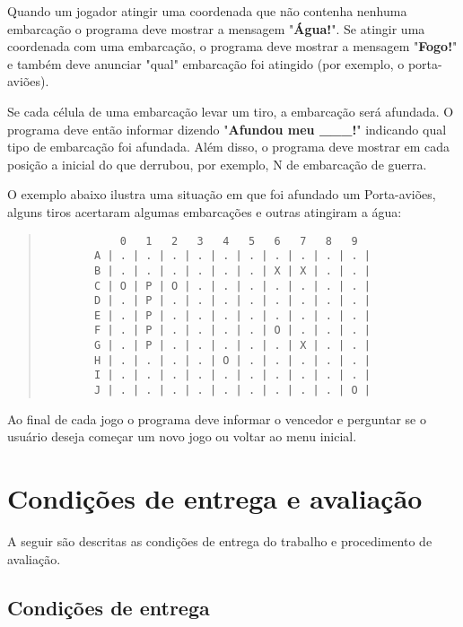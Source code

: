 \documentclass[defesa,oneside]{ppginf}
\begin{document}
Quando um jogador atingir uma coordenada que não contenha nenhuma embarcação o programa deve mostrar a mensagem "\textbf{Água!}". Se atingir uma coordenada com uma embarcação, o programa deve mostrar a mensagem "\textbf{Fogo!}" e também deve anunciar "qual" embarcação foi atingido (por exemplo, o porta-aviões).

Se cada célula de uma embarcação levar um tiro, a embarcação será afundada. O programa deve então informar dizendo "\textbf{Afundou meu \_\_\_!}" indicando qual tipo de embarcação foi afundada. Além disso, o programa deve mostrar em cada posição a inicial do que derrubou, por exemplo, N de embarcação de guerra. 

O exemplo abaixo ilustra uma situação em que foi afundado um Porta-aviões, alguns tiros acertaram algumas embarcações e outras atingiram a água:

\begin{quote}
	\begin{footnotesize}
		\begin{verbatim}
		    0   1   2   3   4   5   6   7   8   9
		A | . | . | . | . | . | . | . | . | . | . |
		B | . | . | . | . | . | . | X | X | . | . |
		C | O | P | O | . | . | . | . | . | . | . |
		D | . | P | . | . | . | . | . | . | . | . |
		E | . | P | . | . | . | . | . | . | . | . |
		F | . | P | . | . | . | . | O | . | . | . |
		G | . | P | . | . | . | . | . | X | . | . |
		H | . | . | . | . | O | . | . | . | . | . |
		I | . | . | . | . | . | . | . | . | . | . |
		J | . | . | . | . | . | . | . | . | . | O |
		\end{verbatim}		
	\end{footnotesize}
\end{quote}

Ao final de cada jogo o programa deve informar o vencedor e perguntar se o usuário deseja começar um novo jogo ou voltar ao menu inicial.


\chapter{Condições de entrega e avaliação}

A seguir são descritas as condições de entrega do trabalho e procedimento de avaliação.

\section{Condições de entrega}
\end{document}

